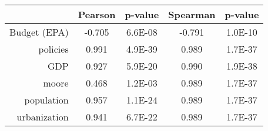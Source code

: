 \begin{tabular}{rcccc}
	\toprule
		& Pearson & p-value & Spearman & p-value	 \\
	\midrule
	Budget (EPA)   & -0.705   & 6.6E-08   & -0.791    & 1.0E-10    \\
	policies     & 0.991   & 4.9E-39   & 0.989    & 1.7E-37    \\
	GDP          & 0.927   & 5.9E-20   & 0.990    & 1.9E-38    \\
	moore        & 0.468   & 1.2E-03   & 0.989    & 1.7E-37    \\
	population   & 0.957   & 1.1E-24   & 0.989    & 1.7E-37    \\
	urbanization & 0.941   & 6.7E-22   & 0.989    & 1.7E-37    \\
	\bottomrule
\end{tabular}
